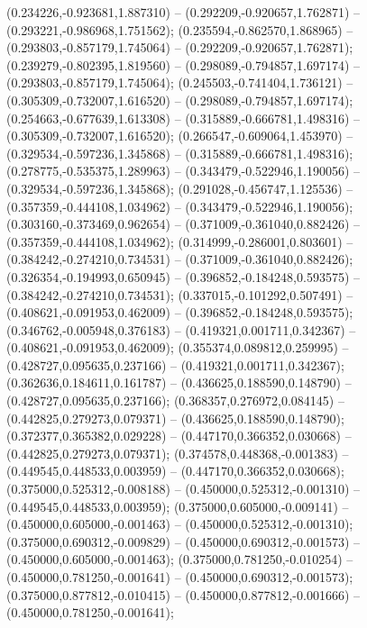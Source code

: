  (0.234226,-0.923681,1.887310) -- (0.292209,-0.920657,1.762871) -- (0.293221,-0.986968,1.751562);
 (0.235594,-0.862570,1.868965) -- (0.293803,-0.857179,1.745064) -- (0.292209,-0.920657,1.762871);
 (0.239279,-0.802395,1.819560) -- (0.298089,-0.794857,1.697174) -- (0.293803,-0.857179,1.745064);
 (0.245503,-0.741404,1.736121) -- (0.305309,-0.732007,1.616520) -- (0.298089,-0.794857,1.697174);
 (0.254663,-0.677639,1.613308) -- (0.315889,-0.666781,1.498316) -- (0.305309,-0.732007,1.616520);
 (0.266547,-0.609064,1.453970) -- (0.329534,-0.597236,1.345868) -- (0.315889,-0.666781,1.498316);
 (0.278775,-0.535375,1.289963) -- (0.343479,-0.522946,1.190056) -- (0.329534,-0.597236,1.345868);
 (0.291028,-0.456747,1.125536) -- (0.357359,-0.444108,1.034962) -- (0.343479,-0.522946,1.190056);
 (0.303160,-0.373469,0.962654) -- (0.371009,-0.361040,0.882426) -- (0.357359,-0.444108,1.034962);
 (0.314999,-0.286001,0.803601) -- (0.384242,-0.274210,0.734531) -- (0.371009,-0.361040,0.882426);
 (0.326354,-0.194993,0.650945) -- (0.396852,-0.184248,0.593575) -- (0.384242,-0.274210,0.734531);
 (0.337015,-0.101292,0.507491) -- (0.408621,-0.091953,0.462009) -- (0.396852,-0.184248,0.593575);
 (0.346762,-0.005948,0.376183) -- (0.419321,0.001711,0.342367) -- (0.408621,-0.091953,0.462009);
 (0.355374,0.089812,0.259995) -- (0.428727,0.095635,0.237166) -- (0.419321,0.001711,0.342367);
 (0.362636,0.184611,0.161787) -- (0.436625,0.188590,0.148790) -- (0.428727,0.095635,0.237166);
 (0.368357,0.276972,0.084145) -- (0.442825,0.279273,0.079371) -- (0.436625,0.188590,0.148790);
 (0.372377,0.365382,0.029228) -- (0.447170,0.366352,0.030668) -- (0.442825,0.279273,0.079371);
 (0.374578,0.448368,-0.001383) -- (0.449545,0.448533,0.003959) -- (0.447170,0.366352,0.030668);
 (0.375000,0.525312,-0.008188) -- (0.450000,0.525312,-0.001310) -- (0.449545,0.448533,0.003959);
 (0.375000,0.605000,-0.009141) -- (0.450000,0.605000,-0.001463) -- (0.450000,0.525312,-0.001310);
 (0.375000,0.690312,-0.009829) -- (0.450000,0.690312,-0.001573) -- (0.450000,0.605000,-0.001463);
 (0.375000,0.781250,-0.010254) -- (0.450000,0.781250,-0.001641) -- (0.450000,0.690312,-0.001573);
 (0.375000,0.877812,-0.010415) -- (0.450000,0.877812,-0.001666) -- (0.450000,0.781250,-0.001641);
